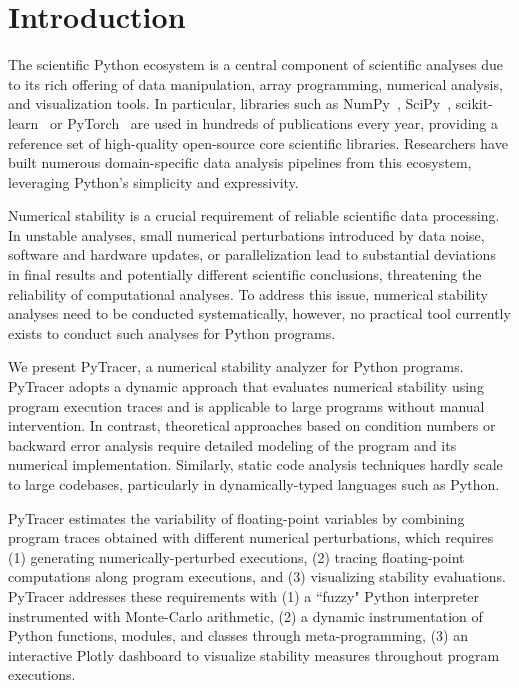 \documentclass[11pt]{article}
\begin{document}
\section{Introduction}

The scientific Python ecosystem is a central component of scientific
analyses due to its rich offering of data manipulation, array programming,
numerical analysis, and visualization tools. In particular, libraries such
as NumPy~\cite{harris2020array}, SciPy~\cite{virtanen2020scipy}, scikit-learn~\cite{pedregosa2011scikit} or PyTorch~\cite{paszke2019pytorch} are used in hundreds of publications every year, providing a reference set of high-quality open-source core scientific libraries. Researchers have built numerous domain-specific data analysis pipelines from this ecosystem, leveraging Python's simplicity and expressivity. 

Numerical stability is a crucial requirement of reliable scientific data
processing. In unstable analyses, small numerical perturbations introduced by data noise, software and hardware updates, or parallelization lead to substantial deviations in final results and potentially different scientific conclusions, threatening the reliability of computational analyses. To address this issue, numerical stability analyses need to be conducted systematically, however, no practical tool currently exists to conduct such analyses for Python programs.

We present PyTracer, a numerical stability analyzer for Python programs.
PyTracer adopts a dynamic approach that evaluates numerical stability using program execution traces and is applicable to large programs without manual intervention. In contrast, theoretical approaches based on condition numbers or backward error analysis require detailed modeling of the program and its numerical implementation. Similarly, static code analysis techniques hardly scale to large codebases, particularly in dynamically-typed languages such as Python.

PyTracer estimates the variability of floating-point variables by combining program traces obtained with different numerical perturbations, which requires (1) generating numerically-perturbed executions, (2) tracing floating-point computations along program executions, and (3) visualizing stability evaluations. PyTracer addresses these requirements with (1) a ``fuzzy" Python interpreter instrumented with Monte-Carlo arithmetic, (2) a dynamic instrumentation of Python functions, modules, and classes through meta-programming, (3) an interactive Plotly dashboard to visualize stability measures throughout program executions.
\end{document}
